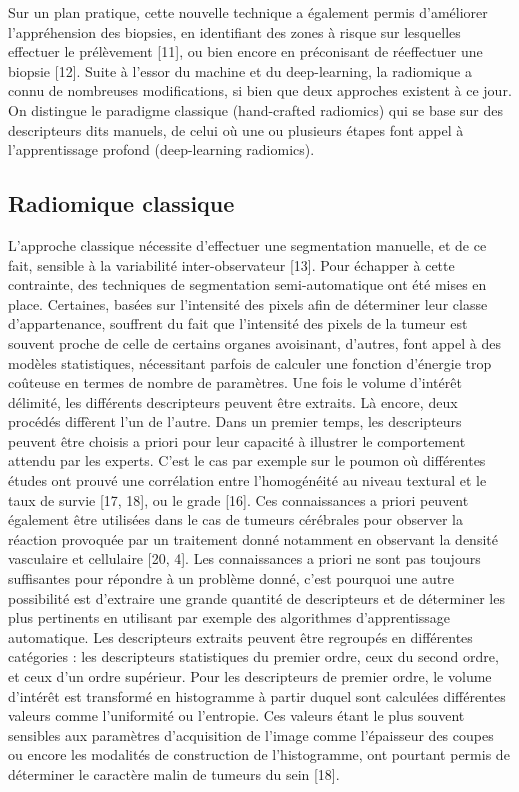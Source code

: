 \documentclass[]{memoir}
\begin{document}
Sur un plan pratique, cette nouvelle technique a également permis d’améliorer l’appréhension des biopsies, en identifiant des zones à risque sur lesquelles effectuer le prélèvement [11], ou bien encore en préconisant de réeffectuer une biopsie [12].
Suite à l’essor du machine et du deep-learning, la radiomique a connu de nombreuses modifications, si bien que deux approches existent à ce jour.
On distingue le paradigme classique (hand-crafted radiomics) qui se base sur des descripteurs dits manuels, de celui où une ou plusieurs étapes font appel à l’apprentissage profond (deep-learning radiomics).

\subsection{Radiomique classique}
L’approche classique nécessite d’effectuer une segmentation manuelle, et de ce fait, sensible à la variabilité inter-observateur [13]. Pour échapper à cette contrainte, des techniques de segmentation semi-automatique ont été mises en place. Certaines, basées sur l’intensité des pixels afin de déterminer leur classe d’appartenance, souffrent du fait que l’intensité des pixels de la tumeur est souvent proche de celle de certains organes avoisinant, d’autres, font appel à des modèles statistiques, nécessitant parfois de calculer une fonction d’énergie trop coûteuse en termes de nombre de paramètres.
Une fois le volume d’intérêt délimité, les différents descripteurs peuvent être extraits. Là encore, deux procédés diffèrent l’un de l’autre. Dans un premier temps, les descripteurs peuvent être choisis a priori pour leur capacité à illustrer le comportement attendu par les experts. C’est le cas par exemple sur le poumon où différentes études ont prouvé une corrélation entre l’homogénéité au niveau textural et le taux de survie [17, 18], ou le grade [16]. Ces connaissances a priori peuvent également être utilisées dans le cas de tumeurs cérébrales pour observer la réaction provoquée par un traitement donné notamment en observant la densité vasculaire et cellulaire [20, 4]. Les connaissances a priori ne sont pas toujours suffisantes pour répondre à un problème donné, c’est pourquoi une autre possibilité est d’extraire une grande quantité de descripteurs et de déterminer les plus pertinents en utilisant par exemple des algorithmes d’apprentissage automatique.
Les descripteurs extraits peuvent être regroupés en différentes catégories : les descripteurs statistiques du premier ordre, ceux du second ordre, et ceux d’un ordre supérieur. Pour les descripteurs de premier ordre, le volume d’intérêt est transformé en histogramme à partir duquel sont calculées différentes valeurs comme l’uniformité ou l’entropie. Ces valeurs étant le plus souvent sensibles aux paramètres d’acquisition de l’image comme l’épaisseur des coupes ou encore les modalités de construction de l’histogramme, ont pourtant permis de déterminer le caractère malin de tumeurs du sein [18].
\end{document}

